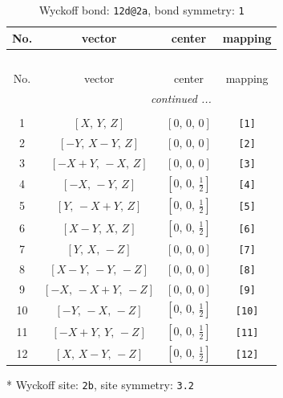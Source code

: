 \documentclass[fleqn,8pt]{jsarticle}
\begin{document}
\begin{longtable}{cccc}
\caption{Wyckoff bond: {\tt 12d@2a}, bond symmetry: {\tt 1}}
 \\
 \hline \hline
No. & vector & center & mapping \\ \hline \endfirsthead

\multicolumn{3}{l}{\tablename\ \thetable{}} \\
 \hline \hline
No. & vector & center & mapping \\ \hline \endhead

 \hline \hline
\multicolumn{3}{r}{\footnotesize\it continued ...} \\ \endfoot

 \hline \hline
\multicolumn{3}{r}{} \\ \endlastfoot

1 & $\left[ X,\, Y,\, Z \right]$ & $\left[ 0,\, 0,\, 0 \right]$ & {\tt [1]} \\ \hline
2 & $\left[ - Y,\, X - Y,\, Z \right]$ & $\left[ 0,\, 0,\, 0 \right]$ & {\tt [2]} \\ \hline
3 & $\left[ - X + Y,\, - X,\, Z \right]$ & $\left[ 0,\, 0,\, 0 \right]$ & {\tt [3]} \\ \hline
4 & $\left[ - X,\, - Y,\, Z \right]$ & $\left[ 0,\, 0,\, \frac{1}{2} \right]$ & {\tt [4]} \\ \hline
5 & $\left[ Y,\, - X + Y,\, Z \right]$ & $\left[ 0,\, 0,\, \frac{1}{2} \right]$ & {\tt [5]} \\ \hline
6 & $\left[ X - Y,\, X,\, Z \right]$ & $\left[ 0,\, 0,\, \frac{1}{2} \right]$ & {\tt [6]} \\ \hline
7 & $\left[ Y,\, X,\, - Z \right]$ & $\left[ 0,\, 0,\, 0 \right]$ & {\tt [7]} \\ \hline
8 & $\left[ X - Y,\, - Y,\, - Z \right]$ & $\left[ 0,\, 0,\, 0 \right]$ & {\tt [8]} \\ \hline
9 & $\left[ - X,\, - X + Y,\, - Z \right]$ & $\left[ 0,\, 0,\, 0 \right]$ & {\tt [9]} \\ \hline
10 & $\left[ - Y,\, - X,\, - Z \right]$ & $\left[ 0,\, 0,\, \frac{1}{2} \right]$ & {\tt [10]} \\ \hline
11 & $\left[ - X + Y,\, Y,\, - Z \right]$ & $\left[ 0,\, 0,\, \frac{1}{2} \right]$ & {\tt [11]} \\ \hline
12 & $\left[ X,\, X - Y,\, - Z \right]$ & $\left[ 0,\, 0,\, \frac{1}{2} \right]$ & {\tt [12]} \\
\end{longtable}
* Wyckoff site: {\tt 2b}, site symmetry: {\tt 3.2}
\renewcommand{\arraystretch}{1.2}
\end{document}
